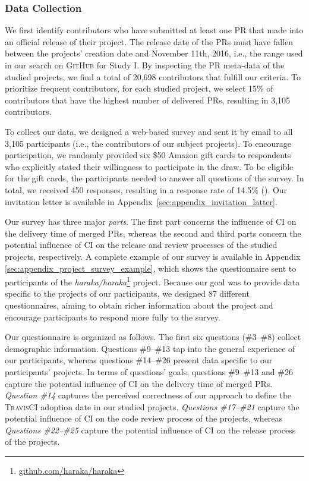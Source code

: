 \subsubsection{Data Collection}
\label{sec:data_collection}

We first identify contributors who have submitted at least one PR that made into an official release of their project. The release date of the PRs must have fallen between the projects' creation date and November 11th, 2016, i.e., the range used in our search on \textsc{GitHub} for Study I. By inspecting the PR meta-data of the studied projects, we find a total of 20,698 contributors that fulfill our criteria. To prioritize frequent contributors, for each studied project, we select 15\% of contributors that have the highest number of delivered PRs, resulting in 3,105 contributors.

To collect our data, we designed a web-based survey and sent it by email to all 3,105 participants (i.e., the contributors of our subject projects). To encourage participation, we randomly provided six \$50 Amazon gift cards to respondents who explicitly stated their willingness to participate in the draw. To be eligible for the gift cards, the participants needed to answer all questions of the survey. In total, we received 450 responses, resulting in a response rate of 14.5\% (). Our invitation letter is available in Appendix~\ref{sec:appendix_invitation_latter}.

Our survey has three major \textit{parts}. The first part concerns the influence of CI on the delivery time of merged PRs, whereas the second and third parts concern the potential influence of CI on the release and review processes of the studied projects, respectively. A complete example of our survey is available in Appendix \ref{sec:appendix_project_survey_example}, which shows the questionnaire sent to participants of the \textit{haraka/haraka}\footnote{\url{github.com/haraka/haraka}} project. Because our goal was to provide data specific to the projects of our participants, we designed 87 different questionnaires, aiming to obtain richer information about the project and encourage participants to respond more fully to the survey.

Our questionnaire is organized as follows. The first six questions (\#3--\#8) collect demographic information. Questions \#9--\#13 tap into the general experience of our participants, whereas questions \#14--\#26 present data specific to our participants' projects. 
In terms of questions' goals, questions \#9--\#13 and \#26 capture the potential influence of CI on the delivery time of merged PRs. 
\textit{Question \#14} captures the perceived correctness of our approach to define the \textsc{TravisCI} adoption date in our studied projects. 
\textit{Questions \#17--\#21} capture the potential influence of CI on the code review process of the projects, whereas \textit{Questions \#22--\#25} capture the potential influence of CI on the release process of the projects. 

